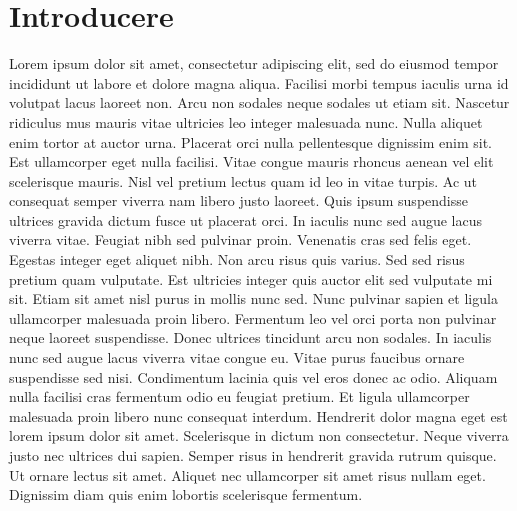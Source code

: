 
\chapter{Introducere}  %

\ifpdf
    \graphicspath{{Chapter1/Figs/Raster/}{Chapter1/Figs/PDF/}{Chapter1/Figs/}}
\else
    \graphicspath{{Chapter1/Figs/Vector/}{Chapter1/Figs/}}
\fi

Lorem ipsum dolor sit amet, consectetur adipiscing elit, sed do eiusmod tempor incididunt ut labore et dolore magna aliqua. Facilisi morbi tempus iaculis urna id volutpat lacus laoreet non. Arcu non sodales neque sodales ut etiam sit. Nascetur ridiculus mus mauris vitae ultricies leo integer malesuada nunc. Nulla aliquet enim tortor at auctor urna. Placerat orci nulla pellentesque dignissim enim sit. Est ullamcorper eget nulla facilisi. Vitae congue mauris rhoncus aenean vel elit scelerisque mauris. Nisl vel pretium lectus quam id leo in vitae turpis. Ac ut consequat semper viverra nam libero justo laoreet. Quis ipsum suspendisse ultrices gravida dictum fusce ut placerat orci. In iaculis nunc sed augue lacus viverra vitae. Feugiat nibh sed pulvinar proin. Venenatis cras sed felis eget. Egestas integer eget aliquet nibh. Non arcu risus quis varius. Sed sed risus pretium quam vulputate.
Est ultricies integer quis auctor elit sed vulputate mi sit. Etiam sit amet nisl purus in mollis nunc sed. Nunc pulvinar sapien et ligula ullamcorper malesuada proin libero. Fermentum leo vel orci porta non pulvinar neque laoreet suspendisse. Donec ultrices tincidunt arcu non sodales. In iaculis nunc sed augue lacus viverra vitae congue eu. Vitae purus faucibus ornare suspendisse sed nisi. Condimentum lacinia quis vel eros donec ac odio. Aliquam nulla facilisi cras fermentum odio eu feugiat pretium. Et ligula ullamcorper malesuada proin libero nunc consequat interdum. Hendrerit dolor magna eget est lorem ipsum dolor sit amet. Scelerisque in dictum non consectetur. Neque viverra justo nec ultrices dui sapien. Semper risus in hendrerit gravida rutrum quisque. Ut ornare lectus sit amet. Aliquet nec ullamcorper sit amet risus nullam eget. Dignissim diam quis enim lobortis scelerisque fermentum.


